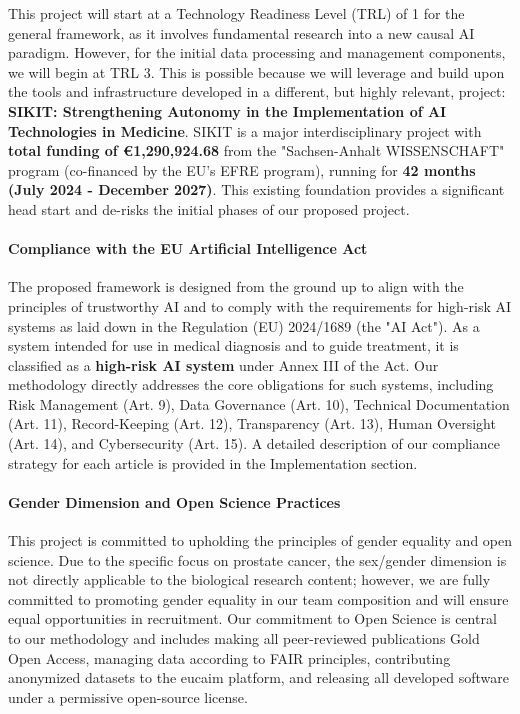 \documentclass[11pt, a4paper]{article}
\begin{document}
This project will start at a Technology Readiness Level (TRL) of 1 for the general framework, as it involves fundamental research into a new causal AI paradigm. However, for the initial data processing and management components, we will begin at TRL 3. This is possible because we will leverage and build upon the tools and infrastructure developed in a different, but highly relevant, project: \textbf{SIKIT: Strengthening Autonomy in the Implementation of AI Technologies in Medicine}. SIKIT is a major interdisciplinary project with \textbf{total funding of €1,290,924.68} from the "Sachsen-Anhalt WISSENSCHAFT" program (co-financed by the EU's EFRE program), running for \textbf{42 months (July 2024 - December 2027)}. This existing foundation provides a significant head start and de-risks the initial phases of our proposed project.

\paragraph{Compliance with the EU Artificial Intelligence Act}
The proposed framework is designed from the ground up to align with the principles of trustworthy AI and to comply with the requirements for high-risk AI systems as laid down in the Regulation (EU) 2024/1689 (the "AI Act"). As a system intended for use in medical diagnosis and to guide treatment, it is classified as a \textbf{high-risk AI system} under Annex III of the Act. Our methodology directly addresses the core obligations for such systems, including Risk Management (Art. 9), Data Governance (Art. 10), Technical Documentation (Art. 11), Record-Keeping (Art. 12), Transparency (Art. 13), Human Oversight (Art. 14), and Cybersecurity (Art. 15). A detailed description of our compliance strategy for each article is provided in the Implementation section.

\paragraph{Gender Dimension and Open Science Practices}
This project is committed to upholding the principles of gender equality and open science. Due to the specific focus on prostate cancer, the sex/gender dimension is not directly applicable to the biological research content; however, we are fully committed to promoting gender equality in our team composition and will ensure equal opportunities in recruitment. Our commitment to Open Science is central to our methodology and includes making all peer-reviewed publications Gold Open Access, managing data according to FAIR principles, contributing anonymized datasets to the \gls{eucaim} platform, and releasing all developed software under a permissive open-source license.
\end{document}
